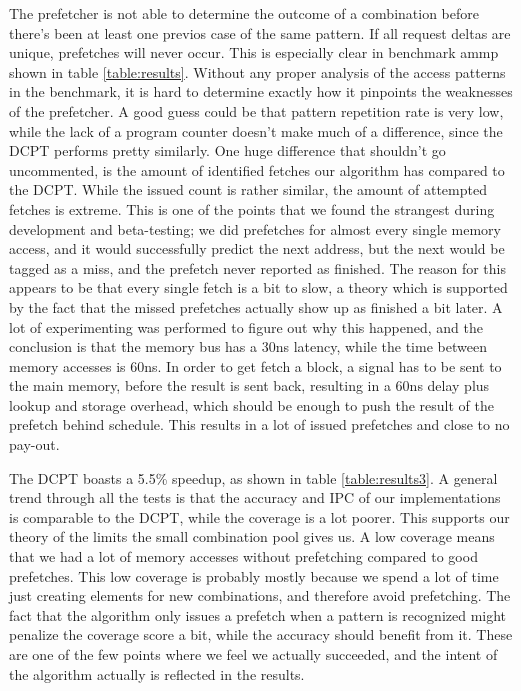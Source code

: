 The prefetcher is not able to determine the outcome of a combination before there's been at least one previos case of the same pattern. If all request deltas are unique, prefetches will never occur. This is especially clear in benchmark ammp shown in table \ref{table:results}. Without any proper analysis of the access patterns in the benchmark, it is hard to determine exactly how it pinpoints the weaknesses of the prefetcher. A good guess could be that pattern repetition rate is very low, while the lack of a program counter doesn't make much of a difference, since the DCPT performs pretty similarly. One huge difference that shouldn't go uncommented, is the amount of identified fetches our algorithm has compared to the DCPT. While the issued count is rather similar, the amount of attempted fetches is extreme. This is one of the points that we found the strangest during development and beta-testing; we did prefetches for almost every single memory access, and it would successfully predict the next address, but the next would be tagged as a miss, and the prefetch never reported as finished. The reason for this appears to be that every single fetch is a bit to slow, a theory which is supported by the fact that the missed prefetches actually show up as finished a bit later. A lot of experimenting was performed to figure out why this happened, and the conclusion is that the memory bus has a 30ns latency, while the time between memory accesses is 60ns. In order to get fetch a block, a signal has to be sent to the main memory, before the result is sent back, resulting in a 60ns delay plus lookup and storage overhead, which should be enough to push the result of the prefetch behind schedule. This results in a lot of issued prefetches and close to no pay-out.

The DCPT boasts a 5.5\% speedup, as shown in table \ref{table:results3}. A general trend through all the tests is that the accuracy and IPC of our implementations is comparable to the DCPT, while the coverage is a lot poorer. This supports our theory of the limits the small combination pool gives us. A low coverage means that we had a lot of memory accesses without prefetching compared to good prefetches. This low coverage is probably mostly because we spend a lot of time just creating elements for new combinations, and therefore avoid prefetching. The fact that the algorithm only issues a prefetch when a pattern is recognized might penalize the coverage score a bit, while the accuracy should benefit from it. These are one of the few points where we feel we actually succeeded, and the intent of the algorithm actually is reflected in the results. 

